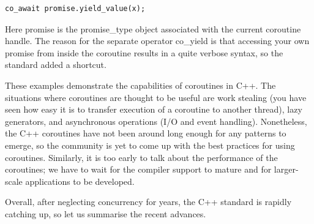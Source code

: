 \begin{lstlisting}[style=styleCXX]
co_await promise.yield_value(x);
\end{lstlisting}

Here promise is the promise\_type object associated with the current coroutine handle. The reason for the separate operator co\_yield is that accessing your own promise from inside the coroutine results in a quite verbose syntax, so the standard added a shortcut.

These examples demonstrate the capabilities of coroutines in C++. The situations where coroutines are thought to be useful are work stealing (you have seen how easy it is to transfer execution of a coroutine to another thread), lazy generators, and asynchronous operations (I/O and event handling). Nonetheless, the C++ coroutines have not been around long enough for any patterns to emerge, so the community is yet to come up with the best practices for using coroutines. Similarly, it is too early to talk about the performance of the coroutines; we have to wait for the compiler support to mature and for larger-scale applications to be developed. 

Overall, after neglecting concurrency for years, the C++ standard is rapidly catching up, so let us summarise the recent advances.









